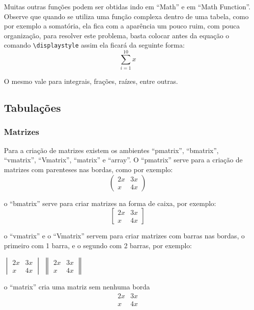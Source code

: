 Muitas outras funções podem ser obtidas indo em ``Math'' e em ``Math Function''. Observe que quando se utiliza uma função complexa dentro de uma tabela, como por exemplo a somatória, ela fica com a aparência um pouco ruim, com pouca organização, para resolver este problema, basta colocar antes da equação o comando \lstinline|\displaystyle| assim ela ficará da seguinte forma:
\[
\sum_{i=1}^{10}{x}
\]

O mesmo vale para integrais, frações, raízes, entre outras.
\subsection{Tabulações}
\subsubsection{Matrizes}
Para a criação de matrizes existem os ambientes ``pmatrix'', ``bmatrix'', ``vmatrix'', ``Vmatrix'', ``matrix'' e ``array''. O ``pmatrix'' serve para a criação de matrizes com parenteses nas bordas, como por exemplo:
\[
\begin{pmatrix}
	2x & 3x \\ 
	x & 4x
\end{pmatrix} 
\]

o ``bmatrix'' serve para criar matrizes na forma de caixa, por exemplo:
\[
\begin{bmatrix}
2x & 3x \\ 
x & 4x
\end{bmatrix} 
\]

o ``vmatrix'' e o ``Vmatrix'' servem para criar matrizes com barras nas bordas, o primeiro com 1 barra, e o segundo com 2 barras, por exemplo: \\
\begin{center}
$
\begin{vmatrix}
2x & 3x \\ 
x & 4x
\end{vmatrix} 
$
\hspace*{2cm}
$
\begin{Vmatrix}
2x & 3x \\ 
x & 4x
\end{Vmatrix} 
$
\end{center}

o ``matrix'' cria uma matriz sem nenhuma borda
\[
\begin{matrix}
2x & 3x \\ 
x & 4x
\end{matrix}
\]

